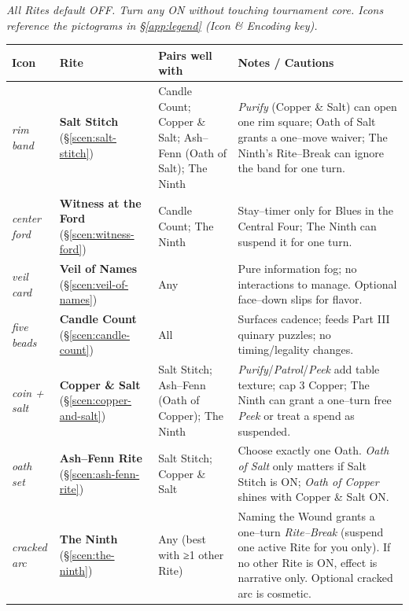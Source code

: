 \documentclass[11pt]{article}
\numberwithin{equation}{section} %
\theoremstyle{plain} %
\theoremstyle{definition} %
\theoremstyle{remark} %
\renewcommand{\arraystretch}{1.15}
\begin{document}
\noindent\textit{All Rites default \textsc{OFF}. Turn any \textsc{ON} without touching tournament core. Icons reference the pictograms in \S\ref{app:legend} (Icon \& Encoding key).}

\medskip
\renewcommand{\arraystretch}{1.18}
\begin{tabular}{p{2.2cm} p{3.8cm} p{6.6cm} p{4.2cm}}
\toprule
\textbf{Icon} & \textbf{Rite} & \textbf{Pairs well with} & \textbf{Notes / Cautions}\\
\midrule
\textit{rim band} %
& \textbf{Salt Stitch} (\S\ref{scen:salt-stitch})
& Candle Count; Copper \& Salt; Ash–Fenn (Oath of Salt); The Ninth
& \emph{Purify} (Copper \& Salt) can open one rim square; Oath of Salt grants a one–move waiver; The Ninth’s Rite–Break can ignore the band for one turn.\\

\textit{center ford} %
& \textbf{Witness at the Ford} (\S\ref{scen:witness-ford})
& Candle Count; The Ninth
& Stay–timer only for Blues in the Central Four; The Ninth can suspend it for one turn.\\

\textit{veil card} %
& \textbf{Veil of Names} (\S\ref{scen:veil-of-names})
& Any
& Pure information fog; no interactions to manage. Optional face–down slips for flavor.\\

\textit{five beads} %
& \textbf{Candle Count} (\S\ref{scen:candle-count})
& All
& Surfaces cadence; feeds Part III quinary puzzles; no timing/legality changes.\\

\textit{coin + salt} %
& \textbf{Copper \& Salt} (\S\ref{scen:copper-and-salt})
& Salt Stitch; Ash–Fenn (Oath of Copper); The Ninth
& \emph{Purify}/\emph{Patrol}/\emph{Peek} add table texture; cap 3 Copper; The Ninth can grant a one–turn free \emph{Peek} or treat a spend as suspended.\\

\textit{oath set} %
& \textbf{Ash–Fenn Rite} (\S\ref{scen:ash-fenn-rite})
& Salt Stitch; Copper \& Salt
& Choose exactly one Oath. \emph{Oath of Salt} only matters if Salt Stitch is \textsc{ON}; \emph{Oath of Copper} shines with Copper \& Salt \textsc{ON}.\\

\textit{cracked arc} %
& \textbf{The Ninth} (\S\ref{scen:the-ninth})
& Any (best with ≥1 other Rite)
& Naming the Wound grants a one–turn \emph{Rite–Break} (suspend one active Rite for you only). If no other Rite is \textsc{ON}, effect is narrative only. Optional cracked arc is cosmetic.\\
\bottomrule
\end{tabular}
\end{document}

